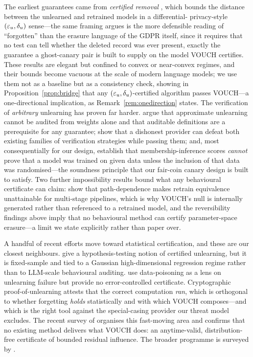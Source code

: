 The earliest guarantees came from \emph{certified removal}
\citep{guo2020certified,sekhari2021remember,neel2021descent,ginart2019making}, which
bounds the distance between the unlearned and retrained models in a differential-
privacy-style $(\varepsilon_u,\delta_u)$ sense---the same framing \citet{dang2021rtbf}
argues is the more defensible reading of ``forgotten'' than the erasure language of
the GDPR itself, since it requires that no test can tell whether the deleted record
was ever present, exactly the guarantee a ghost-canary pair is built to supply on the
model VOUCH certifies. These results are elegant but confined to
convex or near-convex regimes, and their bounds become vacuous at the scale of modern
language models; we use them not as a baseline but as a consistency check, showing in
Proposition~\ref{prop:bridge} that any $(\varepsilon_u,\delta_u)$-certified algorithm passes
VOUCH---a one-directional implication, as Remark~\ref{rem:onedirection} states.
The verification of \emph{arbitrary} unlearning has proven far harder.
\citet{thudi2022necessity} argue that approximate unlearning cannot be audited from
weights alone and that auditable definitions are a prerequisite for any guarantee;
\citet{zhang2024verification} show that a dishonest provider can defeat both existing
families of verification strategies while passing them; and, most consequentially for
our design, \citet{zhang2024mia} establish that membership-inference scores
\emph{cannot} prove that a model was trained on given data unless the inclusion of
that data was randomised---the soundness principle that our fair-coin canary design
is built to satisfy. Two further impossibility results bound what any behavioural
certificate can claim: \citet{yu2025impossibility} show that path-dependence makes
retrain equivalence unattainable for multi-stage pipelines, which is why VOUCH's null
is internally generated rather than referenced to a retrained model, and the
reversibility findings above imply that no behavioural method can certify
parameter-space erasure---a limit we state explicitly rather than paper over.

A handful of recent efforts move toward statistical certification, and these are our
closest neighbours. \citet{pandey2025gaussian} give a hypothesis-testing notion of
certified unlearning, but it is fixed-sample and tied to a Gaussian high-dimensional
regression regime rather than to LLM-scale behavioural auditing.
\citet{pawelczyk2025machine} use data-poisoning as a lens on unlearning failure but
provide no error-controlled certificate. Cryptographic proof-of-unlearning
\citep{eisenhofer2025verifiable} attests that the correct computation \emph{ran},
which is orthogonal to whether forgetting \emph{holds} statistically and with which
VOUCH composes---and which is the right tool against the special-casing provider our
threat model excludes. The recent survey of \citet{xue2026survey} organises this
fast-moving area and confirms that no existing method delivers what VOUCH does: an
anytime-valid, distribution-free certificate of bounded residual influence. The
broader programme is surveyed by \citet{liu2025rethinking}.

